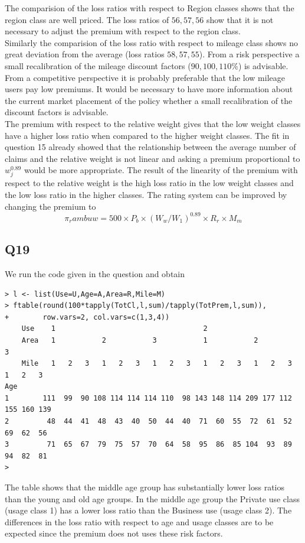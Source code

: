 \documentclass[11pt]{article}
\begin{document}
The comparision of the loss ratios with respect to Region classes shows that the region class are well priced. The loss ratios of $56,57,56$ show that it is not necessary to adjust the premium with respect to the region class. \\

Similarly the comparision of the loss ratio with respect to mileage class shows no great deviation from the average (loss ratios $58,57,55$). From a risk perspective a small recalibration of the mileage discount factors ($90, 100, 110 \%$) is advisable. From a competitive perspective it is probably preferable that the low mileage users pay low premiums. It would be necessary to have more information about the current market placement of the policy whether a small recalibration of the discount factors is advisable. \\

The premium with respect to the relative weight gives that the low weight classes have a higher loss ratio when compared to the higher weight classes. The fit in question 15 already showed that the relationship between the average number of claims and the relative weight is not linear and asking a premium proportional to $w_j^0.89$ would be more appropriate. The result of the linearity of the premium with respect to the relative weight is the high loss ratio in the low weight classes and the low loss ratio in the higher classes. The rating system can be improved by changing the premium to 
\begin{equation}
\pi_rambuw = 500 \times P_b \times (W_w / W_1)^{0.89} \times R_r \times M_m
\end{equation}

\subsection*{Q19}
We run the code given in the question and obtain
\begin{verbatim}
> l <- list(Use=U,Age=A,Area=R,Mile=M)
> ftable(round(100*tapply(TotCl,l,sum)/tapply(TotPrem,l,sum)),
+        row.vars=2, col.vars=c(1,3,4))
    Use    1                                   2                                
    Area   1           2           3           1           2           3        
    Mile   1   2   3   1   2   3   1   2   3   1   2   3   1   2   3   1   2   3
Age                                                                             
1        111  99  90 108 114 114 114 110  98 143 148 114 209 177 112 155 160 139
2         48  44  41  48  43  40  50  44  40  71  60  55  72  61  52  69  62  56
3         71  65  67  79  75  57  70  64  58  95  86  85 104  93  89  94  82  81
>
\end{verbatim}
The table shows that the middle age group has substantially lower loss ratios than the young and old age groups. In the middle age group the Private use class (usage class 1) has a lower loss ratio than the Business use (usage class 2). The differences in the loss ratio with respect to age and usage classes are to be expected since the premium does not uses these risk factors. \\
\end{document}
